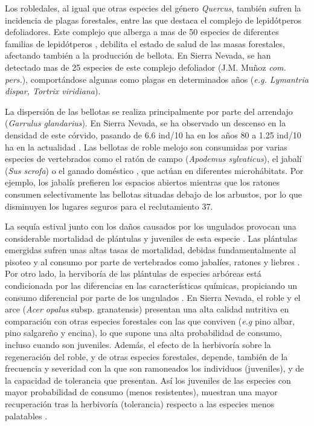 Los robledales, al igual que otras especies del género \emph{Quercus}, también sufren la incidencia de plagas forestales, entre las que destaca el complejo de lepidótperos defoliadores. Este complejo que alberga a mas de 50 especies de diferentes familias de lepidótperos \autocites{Soria1988RelacionLepidopteros,Soria1987LepidopterosDefoliadores}, debilita el estado de salud de las masas forestales, afectando también a la producción de bellota. En Sierra Nevada, se han detectado mas de 25 especies de este complejo defoliador (J.M. Muñoz \emph{com. pers.}), comportándose algunas como plagas en determinados años (\emph{e.g. Lymantria dispar, Tortrix viridiana}).  

La dispersión de las bellotas se realiza principalmente por parte del arrendajo (\emph{Garrulus glandarius}). En Sierra Nevada, se ha observado un descenso en la densidad de este córvido, pasando de 6.6 ind/10 ha en los años 80 a 1.25 ind/10 ha en la actualidad \autocites{ZamoraBareaAzcon2015LongTermChanges}. Las bellotas de roble melojo son consumidas por varias especies de vertebrados como el ratón de campo (\emph{Apodemus sylvaticus}), el jabalí (\emph{Sus scrofa}) o el ganado doméstico \autocites{Pereaetal2014InteraccionesPlantaanimal,Gomezetal2001ProblemasRegeneracion}, que actúan en diferentes microhábitats. Por ejemplo, los jabalís prefieren los espacios abiertos mientras que los ratones consumen selectivamente las bellotas situadas debajo de los arbustos, por lo que disminuyen los lugares seguros para el reclutamiento 37. 

La sequía estival junto con los daños causados por los ungulados provocan una considerable mortalidad de plántulas y juveniles de esta especie \autocites{Pereaetal2014InteraccionesPlantaanimal,Barazaetal2004HerbivoryHas}. Las plántulas emergidas sufren unas altas tasas de mortalidad, debidas fundamentalmente al pisoteo y al consumo por parte de vertebrados como jabalíes, ratones y liebres \autocites{Pereaetal2014InteraccionesPlantaanimal,Gomez2003ImpactVertebrate}. Por otro lado, la herviboría de las plántulas de especies arbóreas está condicionada por las diferencias en las características químicas, propiciando un consumo diferencial por parte de los ungulados \autocites{Baraza2005EfectoPequenos,Barazaetal2007InfluenciaCaracteristicas,Barazaetal2004HerbivoryHas}. En Sierra Nevada, el roble y el arce (\emph{Acer opalus} subsp. {granatensis}) presentan una alta calidad nutritiva en comparación con otras especies forestales con las que conviven (\emph{e.g} pino albar, pino salgareño y encina), lo que supone una alta probabilidad de consumo, incluso cuando son juveniles. Además, el efecto de la herbivoría sobre la regeneración del roble, y de otras especies forestales, depende, también de la frecuencia y severidad con la que son ramoneados los individuos (juveniles), y de la capacidad de tolerancia que presentan. Así los juveniles de las especies con mayor probabilidad de consumo (menos resistentes), muestran una mayor recuperación tras la herbivoría (tolerancia) respecto a las especies menos palatables \autocite{Barazaetal2007InfluenciaCaracteristicas}.   

